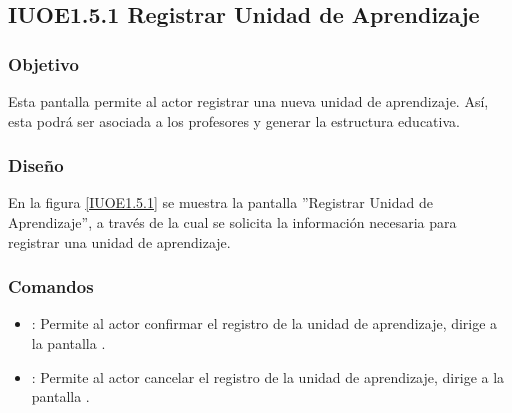 \subsection{IUOE1.5.1 Registrar Unidad de Aprendizaje}

\subsubsection{Objetivo}
	Esta pantalla permite al actor registrar una nueva unidad de aprendizaje. Así, esta podrá ser asociada a los profesores y generar la estructura educativa.

\subsubsection{Diseño}

    En la figura \ref{IUOE1.5.1} se muestra la pantalla ''Registrar Unidad de Aprendizaje'', a través de la cual se solicita la información necesaria para registrar una unidad de aprendizaje.
 

\subsubsection{Comandos}
    \begin{itemize}
	\item {}: Permite al actor confirmar el registro de la unidad de aprendizaje, dirige a la pantalla .
	
	\item {}: Permite al actor cancelar el registro de la unidad de aprendizaje, dirige a la pantalla .
    \end{itemize}
